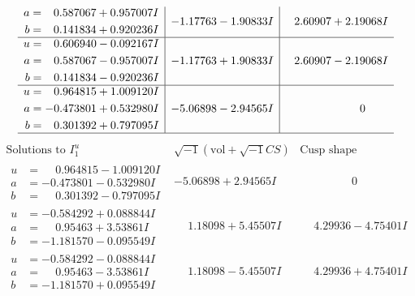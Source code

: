 \documentclass[1p]{elsarticle_modified}
\theoremstyle{definition}
\newcommand{\I}{\sqrt{-1}}
\begin{document}
$$\begin{array}{c|c|c}
\begin{aligned}
a &= \phantom{-}0.587067 + 0.957007 I \\
b &= \phantom{-}0.141834 + 0.920236 I\end{aligned}
 & -1.17763 - 1.90833 I & \phantom{-}2.60907 + 2.19068 I \\ \hline\begin{aligned}
u &= \phantom{-}0.606940 - 0.092167 I \\
a &= \phantom{-}0.587067 - 0.957007 I \\
b &= \phantom{-}0.141834 - 0.920236 I\end{aligned}
 & -1.17763 + 1.90833 I & \phantom{-}2.60907 - 2.19068 I \\ \hline\begin{aligned}
u &= \phantom{-}0.964815 + 1.009120 I \\
a &= -0.473801 + 0.532980 I \\
b &= \phantom{-}0.301392 + 0.797095 I\end{aligned}
 & -5.06898 - 2.94565 I & \phantom{-0.000000 } 0\\
 \hline 
 \end{array}$$\newpage$$\begin{array}{c|c|c}  
\text{Solutions to }I^u_{1}& \I (\text{vol} + \sqrt{-1}CS) & \text{Cusp shape}\\
 \hline 
\begin{aligned}
u &= \phantom{-}0.964815 - 1.009120 I \\
a &= -0.473801 - 0.532980 I \\
b &= \phantom{-}0.301392 - 0.797095 I\end{aligned}
 & -5.06898 + 2.94565 I & \phantom{-0.000000 } 0 \\ \hline\begin{aligned}
u &= -0.584292 + 0.088844 I \\
a &= \phantom{-}0.95463 + 3.53861 I \\
b &= -1.181570 - 0.095549 I\end{aligned}
 & \phantom{-}1.18098 + 5.45507 I & \phantom{-}4.29936 - 4.75401 I \\ \hline\begin{aligned}
u &= -0.584292 - 0.088844 I \\
a &= \phantom{-}0.95463 - 3.53861 I \\
b &= -1.181570 + 0.095549 I\end{aligned}
 & \phantom{-}1.18098 - 5.45507 I & \phantom{-}4.29936 + 4.75401 I \\ \hline\begin{aligned}

\end{aligned}
\end{array}$$
\end{document}
